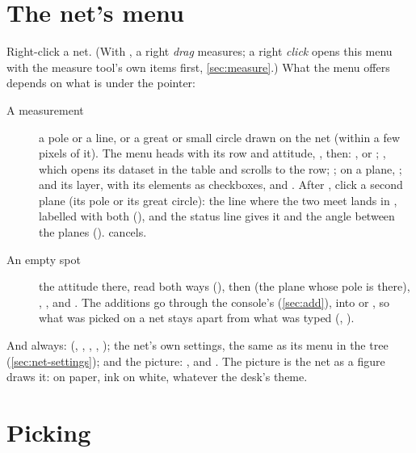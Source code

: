 \section{The net's menu}\label{sec:net-menu}

Right-click a net. (With , a right \emph{drag} measures; a right \emph{click} opens this menu
with the measure tool's own items first, \cref{sec:measure}.) What the menu offers depends on what is under
the pointer:

\begin{description}
\item[A measurement] a pole or a line, or a great or small circle drawn on the net (within a few pixels of
it). The menu heads with its row and attitude, , then: ,  or ; , which opens its dataset in the
table and scrolls to the row; ; on a plane, ; and its layer, with its elements
as checkboxes,  and . After , click a
second plane (its pole or its great circle): the line where the two meet lands in , labelled
with both (), and the status line gives it and the angle between the planes
().  cancels.
\item[An empty spot] the attitude there, read both ways (), then
 (the plane whose pole is there), , ,  and . The additions go through the console's
 (\cref{sec:add}), into  or , so what was picked on a net stays
apart from what was typed (, ).
\end{description}

\noindent And always:  (, ,
, , ); the net's own settings, the same as its menu in the tree
(\cref{sec:net-settings}); and the picture: ,  and .
The picture is the net as a figure draws it: on paper, ink on white, whatever the desk's theme.

\section{Picking}\label{sec:pick}

